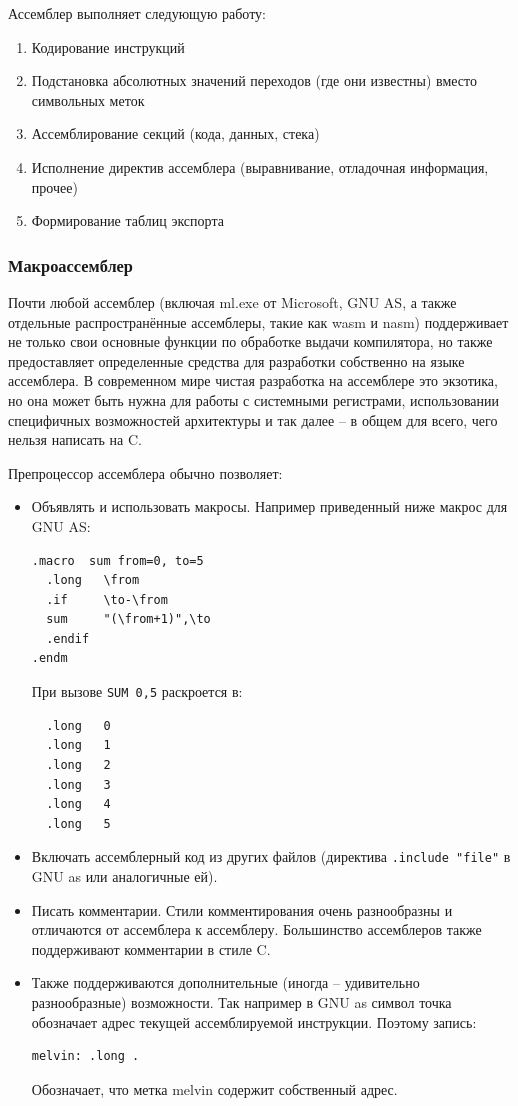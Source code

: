 \documentclass[a4paper,12pt,oneside]{article}
\begin{document}
Ассемблер выполняет следующую работу:

\begin{enumerate}
\item Кодирование инструкций
\item Подстановка абсолютных значений переходов (где они известны) вместо символьных меток
\item Ассемблирование секций (кода, данных, стека)
\item Исполнение директив ассемблера (выравнивание, отладочная информация, прочее)
\item Формирование таблиц экспорта
\end{enumerate}

\subsubsection{Макроассемблер}

Почти любой ассемблер (включая ml.exe от Microsoft, GNU AS, а также отдельные распространённые ассемблеры, такие как wasm и nasm) поддерживает не только свои основные функции по обработке выдачи компилятора, но также предоставляет определенные средства для разработки собственно на языке ассемблера. В современном мире чистая разработка на ассемблере это экзотика, но она может быть нужна для работы с системными регистрами, использовании специфичных возможностей архитектуры и так далее -- в общем для всего, чего нельзя написать на C.

Препроцессор ассемблера обычно позволяет:

\begin{itemize}
\item Объявлять и использовать макросы. Например приведенный ниже макрос для GNU AS:

\begin{verbatim}
.macro  sum from=0, to=5
  .long   \from
  .if     \to-\from
  sum     "(\from+1)",\to
  .endif
.endm
\end{verbatim}

При вызове \lstinline!SUM 0,5! раскроется в:
 
\begin{verbatim}
  .long   0
  .long   1
  .long   2
  .long   3
  .long   4
  .long   5
\end{verbatim}

\item Включать ассемблерный код из других файлов (директива \lstinline!.include "file"! в GNU as или аналогичные ей).
\item Писать комментарии. Стили комментирования очень разнообразны и отличаются от ассемблера к ассемблеру. Большинство ассемблеров также поддерживают комментарии в стиле C.
\item Также поддерживаются дополнительные (иногда -- удивительно разнообразные) возможности. Так например в GNU as символ точка обозначает адрес текущей ассемблируемой инструкции. Поэтому запись:

\begin{verbatim}
melvin: .long .
\end{verbatim}

Обозначает, что метка melvin содержит собственный адрес.
\end{itemize}
\end{document}
